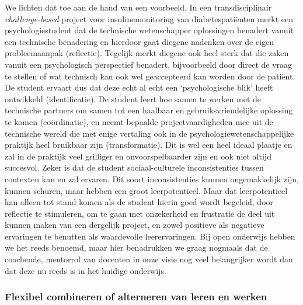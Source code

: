 \documentclass[smallauthor, chapterhaspagenum, nochapterinheader, pagenuminheader,  bigchapnum,medium2, tocpages, garamond, titleinheader]{jote-book}
\begin{document}
	We lichten dat toe aan de hand van een voorbeeld. In een transdisciplinair \emph{challenge-based} project voor insulinemonitoring van diabetespatiënten merkt een psychologiestudent dat de technische wetenschapper oplossingen benadert vanuit een technische benadering en hierdoor gaat diegene nadenken over de eigen probleemaanpak (reflectie). Tegelijk merkt diegene ook heel sterk dat die zaken vanuit een psychologisch perspectief benadert, bijvoorbeeld door direct de vraag te stellen of wat technisch kan ook wel geaccepteerd kan worden door de patiënt. De student ervaart dus dat deze echt al echt een ‘psychologische blik' heeft ontwikkeld (identificatie). De student leert hoe samen te werken met de technische partners om samen tot een haalbaar en gebruiksvriendelijke oplossing te komen (coördinatie), en neemt bepaalde projectvaardigheden mee uit de technische wereld die met enige vertaling ook in de psychologiewetenschappelijke praktijk heel bruikbaar zijn (transformatie). Dit is wel een heel ideaal plaatje en zal in de praktijk veel grilliger en onvoorspelbaarder zijn en ook niet altijd succesvol. Zeker is dat de student sociaal-culturele inconsistenties tussen contexten kan en zal ervaren. Dit soort inconsistenties kunnen ongemakkelijk zijn, kunnen schuren, maar hebben een groot leerpotentieel. Maar dat leerpotentieel kan alleen tot stand komen als de student hierin goed wordt begeleid, door reflectie te stimuleren, om te gaan met onzekerheid en frustratie de deel uit kunnen maken van een dergelijk project, en zowel positieve als negatieve ervaringen te benutten als waardevolle leerervaringen. Bij open onderwijs hebben we het reeds benoemd, maar hier benadrukken we graag nogmaals dat de coachende, mentorrol van docenten in onze visie nog veel belangrijker wordt dan dat deze nu reeds is in het huidige onderwijs.



	\subsubsection{Flexibel combineren of alterneren van leren en werken}
\end{document}
